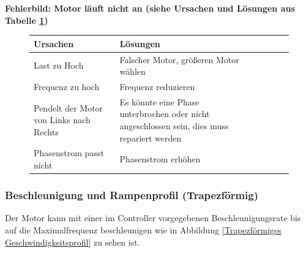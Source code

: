 {\textbf{Fehlerbild: Motor läuft nicht an (siehe Ursachen und Lösungen aus Tabelle \ref{MOTLNA})} 
	\begin{figure}
		\begin{center}
			\fontsize{8}{10}\selectfont
			\begin{tabularx}{\textwidth}{|X|X|X|X|X|X|}
				\hline 
				\textbf{Ursachen} & \textbf{Lösungen} \\ \hline
				Last zu Hoch & Falscher Motor, größeren Motor wählen \\ \hline
				Frequenz zu hoch & Frequenz reduzieren\\ \hline
				Pendelt der Motor von Links nach Rechts & Es könnte eine Phase unterbrochen oder nicht angeschlossen sein, dies muss repariert werden \\ \hline
				Phasenstrom passt nicht & Phasenstrom erhöhen\\ \hline
				
			\end{tabularx}
			 \label{MOTLNA} 
		\end{center}
	\end{figure}
	
	
	\subsubsection{Beschleunigung und Rampenprofil (Trapezförmig)}
	
	Der Motor kann mit einer im Controller vorgegebenen Beschleunigungsrate bis auf die Maximalfrequenz beschleunigen wie in Abbildung \ref{Trapezförmiges Geschwindigkeitsprofil} zu sehen ist.\cite{Faulhaber:2020} 
	
}
